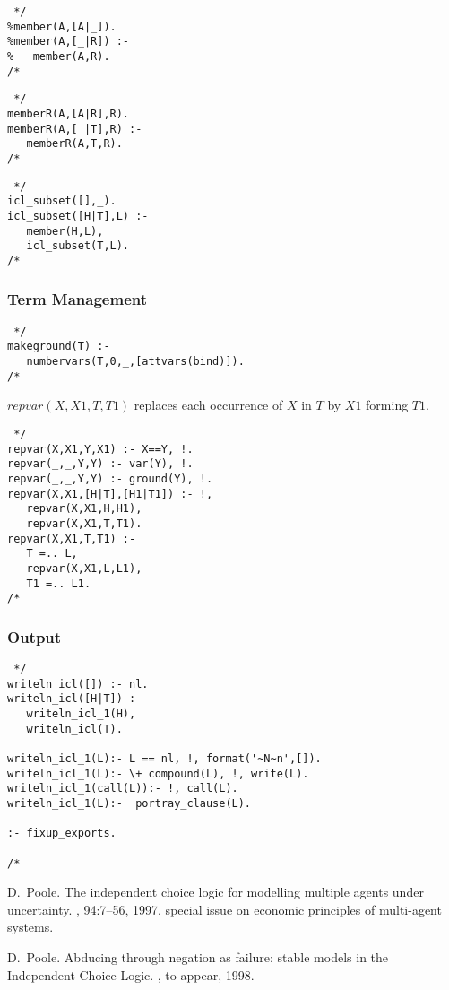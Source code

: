 \documentclass[11pt,fleqn]{article}
\begin{document}
\begin{verbatim} */
%member(A,[A|_]).
%member(A,[_|R]) :-
%   member(A,R).
/* \end{verbatim}
\begin{verbatim} */
memberR(A,[A|R],R).
memberR(A,[_|T],R) :-
   memberR(A,T,R).
/* \end{verbatim}
\begin{verbatim} */
icl_subset([],_).
icl_subset([H|T],L) :-
   member(H,L),
   icl_subset(T,L).
/* \end{verbatim}
\subsubsection{Term Management}

\begin{verbatim} */
makeground(T) :-
   numbervars(T,0,_,[attvars(bind)]).
/* \end{verbatim}

$repvar(X,X1,T,T1)$ replaces each occurrence of $X$ in $T$ by $X1$ forming $T1$.
\begin{verbatim} */
repvar(X,X1,Y,X1) :- X==Y, !.
repvar(_,_,Y,Y) :- var(Y), !.
repvar(_,_,Y,Y) :- ground(Y), !.
repvar(X,X1,[H|T],[H1|T1]) :- !,
   repvar(X,X1,H,H1),
   repvar(X,X1,T,T1).
repvar(X,X1,T,T1) :-
   T =.. L,
   repvar(X,X1,L,L1),
   T1 =.. L1.
/* \end{verbatim}

\subsubsection{Output}
\begin{verbatim} */
writeln_icl([]) :- nl.
writeln_icl([H|T]) :-
   writeln_icl_1(H),
   writeln_icl(T).

writeln_icl_1(L):- L == nl, !, format('~N~n',[]).
writeln_icl_1(L):- \+ compound(L), !, write(L).
writeln_icl_1(call(L)):- !, call(L).
writeln_icl_1(L):-  portray_clause(L).

:- fixup_exports.

/* \end{verbatim}

%
%

\begin{thebibliography}{1}

D.~Poole.
\newblock The independent choice logic for modelling multiple agents under
  uncertainty.
, 94:7--56, 1997.
\newblock special issue on economic principles of multi-agent systems.

D.~Poole.
\newblock Abducing through negation as failure: stable models in the
  {Independent Choice Logic}.
, to appear, 1998.

\end{thebibliography}

\printindex
\end{document}
